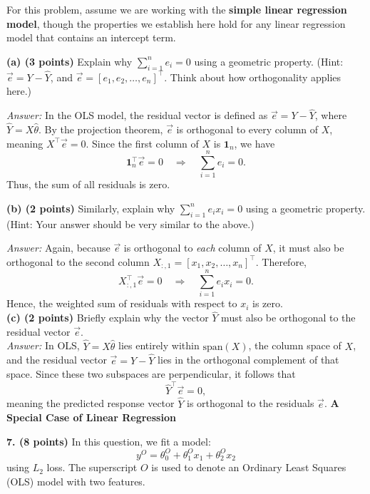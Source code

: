 \documentclass[11pt]{article}
\begin{document}
\medskip
For this problem, assume we are working with the \textbf{simple linear regression model}, though the properties we establish here hold for any linear regression model that contains an intercept term.

\medskip
\noindent\textbf{(a) (3 points)} Explain why $\sum_{i=1}^{n} e_i=0$ using a geometric property. (Hint: $\vec{e}=Y-\hat{Y}$, and $\vec{e}=[e_1,e_2,\dots,e_n]^\top$. Think about how orthogonality applies here.)

\medskip
\noindent\textit{Answer:} In the OLS model, the residual vector is defined as $\vec{e}=Y-\hat{Y}$, where $\hat{Y}=X\hat{\theta}$.  
By the projection theorem, $\vec{e}$ is orthogonal to every column of $X$, meaning $X^\top \vec{e}=0$.  
Since the first column of $X$ is $\mathbf{1}_n$, we have
\[
\mathbf{1}_n^\top \vec{e}=0
\quad\Longrightarrow\quad
\sum_{i=1}^n e_i = 0.
\]
Thus, the sum of all residuals is zero.

\medskip
\noindent\textbf{(b) (2 points)} Similarly, explain why $\sum_{i=1}^{n} e_i x_i=0$ using a geometric property. (Hint: Your answer should be very similar to the above.)

\medskip
\noindent\textit{Answer:}
Again, because $\vec{e}$ is orthogonal to \emph{each} column of $X$, it must also be orthogonal to the second column $X_{:,1} = [x_1, x_2, \dots, x_n]^\top$.  
Therefore,
\[
X_{:,1}^\top \vec{e}=0
\quad\Longrightarrow\quad
\sum_{i=1}^n e_i x_i = 0.
\]
Hence, the weighted sum of residuals with respect to $x_i$ is zero.
\medskip
\\\noindent\textbf{(c) (2 points)} Briefly explain why the vector $\hat{Y}$ must also be orthogonal to the residual vector $\vec{e}$.
\medskip
\\\noindent\textit{Answer:} In OLS, $\hat{Y}=X\hat{\theta}$ lies entirely within $\text{span}(X)$, the column space of $X$,  
and the residual vector $\vec{e}=Y-\hat{Y}$ lies in the orthogonal complement of that space.  
Since these two subspaces are perpendicular, it follows that
\[
\hat{Y}^\top \vec{e}=0,
\]
meaning the predicted response vector $\hat{Y}$ is orthogonal to the residuals $\vec{e}$.
\newpage
\noindent\textbf{\LARGE A Special Case of Linear Regression}

\medskip
\noindent \textbf{7. (8 points)} In this question, we fit a model:
\[
y^{O}=\theta^{O}_0+\theta^{O}_1 x_1+\theta^{O}_2 x_2
\]
using $L_2$ loss. The superscript $O$ is used to denote an Ordinary Least Squares (OLS) model with two features.
\end{document}
